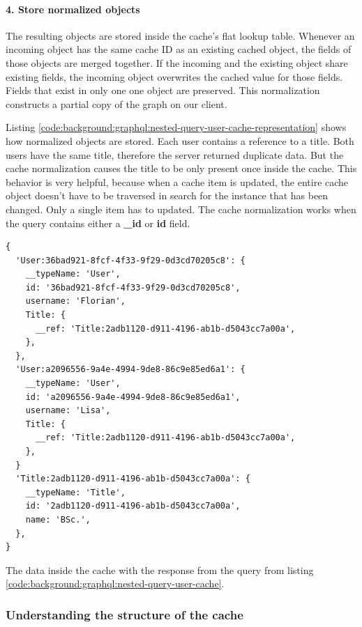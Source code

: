 \paragraph{4. Store normalized objects}

The resulting objects are stored inside the cache's flat lookup table. Whenever an incoming object has the same cache ID as an existing cached object, the fields of those objects are merged together. If the incoming and the existing object share existing fields, the incoming object overwrites the cached value for those fields. Fields that exist in only one one object are preserved. This normalization constructs a partial copy of the graph on our client. \cite{misc:-:background:graphql:apollo-client-cache-overview}

Listing \ref{code:background:graphql:nested-query-user-cache-representation} shows how normalized objects are stored. Each user contains a reference to a title. Both users have the same title, therefore the server returned duplicate data. But the cache normalization causes the title to be only present once inside the cache. This behavior is very helpful, because when a cache item is updated, the entire cache object doesn't have to be traversed in search for the instance that has been changed. Only a single item has to updated. The cache normalization works when the query contains either a \textbf{\_id} or \textbf{id} field.

\ifshowListings
\begin{listing}[H]
    \begin{verbatim}
{
  'User:36bad921-8fcf-4f33-9f29-0d3cd70205c8': {
    __typeName: 'User',
    id: '36bad921-8fcf-4f33-9f29-0d3cd70205c8',
    username: 'Florian',
    Title: {
      __ref: 'Title:2adb1120-d911-4196-ab1b-d5043cc7a00a',
    },
  },
  'User:a2096556-9a4e-4994-9de8-86c9e85ed6a1': {
    __typeName: 'User',
    id: 'a2096556-9a4e-4994-9de8-86c9e85ed6a1',
    username: 'Lisa',
    Title: {
      __ref: 'Title:2adb1120-d911-4196-ab1b-d5043cc7a00a',
    },
  }
  'Title:2adb1120-d911-4196-ab1b-d5043cc7a00a': {
    __typeName: 'Title',
    id: '2adb1120-d911-4196-ab1b-d5043cc7a00a',
    name: 'BSc.',
  },
}
    \end{verbatim}
    \caption{The data inside the cache with the response from the query from listing \ref{code:background:graphql:nested-query-user-cache}.}\label{code:background:graphql:nested-query-user-cache-representation}
\end{listing}
\fi

\subsubsection{Understanding the structure of the cache}

